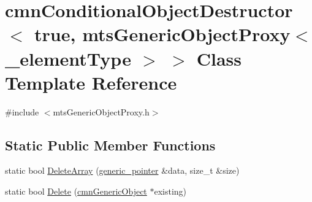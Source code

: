 \hypertarget{classcmn_conditional_object_destructor_3_01true_00_01mts_generic_object_proxy_3_01__element_type_01_4_01_4}{\section{cmn\-Conditional\-Object\-Destructor$<$ true, mts\-Generic\-Object\-Proxy$<$ \-\_\-element\-Type $>$ $>$ Class Template Reference}
\label{classcmn_conditional_object_destructor_3_01true_00_01mts_generic_object_proxy_3_01__element_type_01_4_01_4}
}


{\ttfamily \#include $<$mts\-Generic\-Object\-Proxy.\-h$>$}

\subsection*{Static Public Member Functions}
\begin{DoxyCompactItemize}
\item 
static bool \hyperlink{classcmn_conditional_object_destructor_3_01true_00_01mts_generic_object_proxy_3_01__element_type_01_4_01_4_a7e70c1d2e93e36e8db8525ca77315bac}{Delete\-Array} (\hyperlink{classcmn_generic_object}{generic\-\_\-pointer} \&data, size\-\_\-t \&size)
\item 
static bool \hyperlink{classcmn_conditional_object_destructor_3_01true_00_01mts_generic_object_proxy_3_01__element_type_01_4_01_4_a94030471b4ad9ba9d4c803da8c3d029e}{Delete} (\hyperlink{classcmn_generic_object}{cmn\-Generic\-Object} $\ast$existing)
\end{DoxyCompactItemize}


